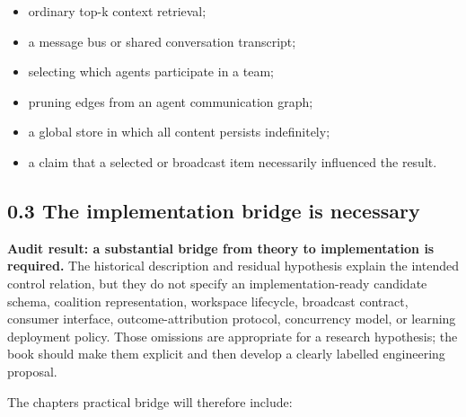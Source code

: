 \begin{itemize}
\tightlist
\item
  ordinary top-k context retrieval;
\item
  a message bus or shared conversation transcript;
\item
  selecting which agents participate in a team;
\item
  pruning edges from an agent communication graph;
\item
  a global store in which all content persists indefinitely;
\item
  a claim that a selected or broadcast item necessarily influenced the result.
\end{itemize}

\subsection{0.3 The implementation bridge is necessary}\label{03-the-implementation-bridge-is-necessary}

\textbf{Audit result: a substantial bridge from theory to implementation is required.} The historical description and residual hypothesis explain the intended control relation, but they do not specify an implementation-ready candidate schema, coalition representation, workspace lifecycle, broadcast contract, consumer interface, outcome-attribution protocol, concurrency model, or learning deployment policy. Those omissions are appropriate for a research hypothesis; the book should make them explicit and then develop a clearly labelled engineering proposal.

The chapter\textquotesingle s practical bridge will therefore include:

